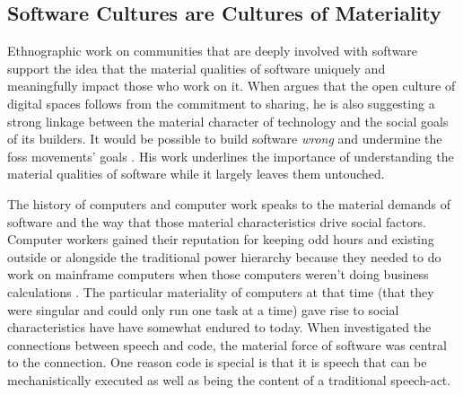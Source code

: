 \documentclass[a4paper,man,natbib,floatsintext]{apa6}
\begin{document}
  \subsection{Software Cultures are Cultures of Materiality}

  Ethnographic work on communities that are deeply involved with software support the idea that the material qualities of software uniquely and meaningfully impact those who work on it. When \citet{Kelty2008-jm} argues that the open culture of digital spaces follows from the commitment to sharing, he is also suggesting a strong linkage between the material character of technology and the social goals of its builders. It would be possible to build software \textit{wrong} and undermine the \gls{foss} movements' goals \citep{Kelty2008-jm}. His work underlines the importance of understanding the material qualities of software while it largely leaves them untouched.

  The history of computers and computer work speaks to the material demands of software and the way that those material characteristics drive social factors. Computer workers gained their reputation for keeping odd hours and existing outside or alongside the traditional power hierarchy because they needed to do work on mainframe computers when those computers weren't doing business calculations \citep{Ensmenger2012-kz}. The particular materiality of computers at that time (that they were singular and could only run one task at a time) gave rise to social characteristics have have somewhat endured to today. When \citet{Cox2013-zo} investigated the connections between speech and code, the material force of software was central to the connection. One reason code is special is that it is speech that can be mechanistically executed as well as being the content of a traditional speech-act. 
\end{document}
